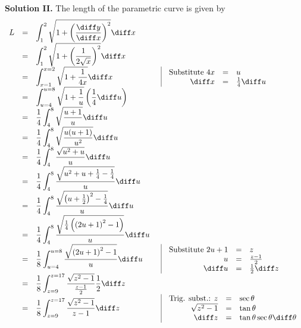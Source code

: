{\textbf{Solution II. } The length of the parametric curve is given by
\[
\begin{array}{rcll|l}
L&=&\displaystyle \int_{1}^{2}\sqrt{1+\left(\frac{\diff y}{\diff x}\right)^2 }\diff x\\
&=&\displaystyle \int_{1}^{2}\sqrt{1+\left(\frac{1}{2\sqrt{x}}\right)^2 }\diff x\\
&=&\displaystyle \int_{x=1}^{x=2} \sqrt{1 +\frac{1}{4x}}\diff x &&\begin{array}{rcl}\text{Substitute }4x&=&u\\\diff x&=&\frac{1}{4}\diff u\\ \end{array}\\
&=&\displaystyle \int_{u=4}^{u=8} \sqrt{1 +\frac{1}{u}}\left(\frac{1}{4}\diff u\right)\\
&=&\displaystyle \frac{1}{4}\int_{4}^{8}\sqrt{\frac{u+1}{u}}\diff u\\
&=&\displaystyle \frac{1}{4}\int_{4}^{8}\sqrt{\frac{u(u+1)}{u^2}}\diff u\\
&=&\displaystyle \frac{1}{4}\int_{4}^{8}\frac{\sqrt{u^2+u }}{u}\diff u\\
&=&\displaystyle \frac{1}{4}\int_{4}^{8}\frac{\sqrt{u^2+u+\frac{1}{4}-\frac{1}{4} }}{u}\diff u\\
&=&\displaystyle \frac{1}{4}\int_{4}^{8}\frac{\sqrt{\left(u+\frac{1}{2}\right)^2-\frac{1}{4} }}{u}\diff u\\
&=&\displaystyle \frac{1}{4}\int_{4}^{8}\frac{ \sqrt{\frac{1}{4}\left( \left(2u+1\right)^2-1\right) }}{u}\diff u\\
&=&\displaystyle \frac{1}{8}\int_{u=4}^{u=8}\frac{ \sqrt{ \left(2u+1\right)^2-1 }}{u}\diff u &&\begin{array}{rcl}\text{Substitute }2u+1&=&z\\ u&=&\frac{z-1}{2}\\\diff u&=&\frac{1}{2}\diff z \end{array}\\ 
&=&\displaystyle \frac{1}{8}\int_{z=9}^{z=17}\frac{ \sqrt{ z^2-1 }}{\frac{z-1}{2}}\frac{1}{2}\diff z \\
&=&\displaystyle \frac{1}{8}\int_{z=9}^{z=17}\frac{ \sqrt{ z^2-1 }}{z-1}\diff z&&  \begin{array}{rcl}
\text{Trig. subst.: }z&=&\sec\theta \\ 
\sqrt{z^2-1}&=&\tan \theta \\
\diff z &= &\tan \theta\sec\theta \diff \theta
\end{array}\\

\end{array}\]}
